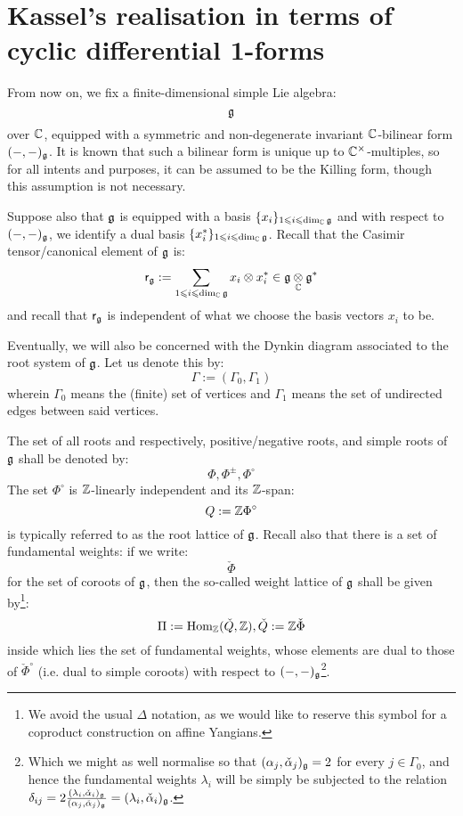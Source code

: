 \section{Kassel's realisation in terms of cyclic differential 1-forms}
    \begin{convention} \label{conv: a_fixed_finite_dimensional_simple_lie_algebra}
        From now on, we fix a finite-dimensional simple Lie algebra:
            $$\mathfrak{g}$$
        over $\mathbb{C}$, equipped with a symmetric and non-degenerate invariant $\mathbb{C}$-bilinear form $(-, -)_{\mathfrak{g}}$. It is known that such a bilinear form is unique up to $\bbC^{\x}$-multiples, so for all intents and purposes, it can be assumed to be the Killing form, though this assumption is not necessary. 

        Suppose also that $\mathfrak{g}$ is equipped with a basis $\{x_i\}_{1 \leqslant i \leqslant \dim_{\mathbb{C}} \mathfrak{g}}$ and with respect to $(-, -)_{\mathfrak{g}}$, we identify a dual basis $\{x_i^*\}_{1 \leqslant i \leqslant \dim_{\mathbb{C}} \mathfrak{g}}$. Recall that the Casimir tensor/canonical element of $\mathfrak{g}$ is:
            $$\sfr_{\g} := \sum_{1 \leq i \leq \dim_{\bbC} \g} x_i \tensor x_i^* \in \g \tensor_{\bbC} \g^*$$
        and recall that $\mathsf{r}_{\mathfrak{g}}$ is independent of what we choose the basis vectors $x_i$ to be.

        Eventually, we will also be concerned with the Dynkin diagram associated to the root system of $\mathfrak{g}$. Let us denote this by:
            $$\Gamma := (\Gamma_0, \Gamma_1)$$
        wherein $\Gamma_0$ means the (finite) set of vertices and $\Gamma_1$ means the set of undirected edges between said vertices. 

        The set of all roots and respectively, positive/negative roots, and simple roots of $\mathfrak{g}$ shall be denoted by:
            $$\Phi, \Phi^{\pm}, \Phi^{\circ}$$
        The set $\Phi^{\circ}$ is $\mathbb{Z}$-linearly independent and its $\mathbb{Z}$-span:
            $$Q := \mathbb{Z} \Phi^{\circ}$$
        is typically referred to as the root lattice of $\mathfrak{g}$. Recall also that there is a set of fundamental weights: if we write:
            $$\check{\Phi}$$
        for the set of coroots of $\mathfrak{g}$, then the so-called weight lattice of $\mathfrak{g}$ shall be given by\footnote{We avoid the usual $\Delta$ notation, as we would like to reserve this symbol for a coproduct construction on affine Yangians.}:
            $$\Pi := \mathrm{Hom}_{\mathbb{Z}}(\check{Q}, \mathbb{Z}), \check{Q} := \mathbb{Z}\check{\Phi}$$
        inside which lies the set of fundamental weights, whose elements are dual to those of $\check{\Phi}^{\circ}$ (i.e. dual to simple coroots) with respect to $(-, -)_{\mathfrak{g}}$\footnote{Which we might as well normalise so that $(\alpha_j, \check{\alpha}_j)_{\mathfrak{g}} = 2$ for every $j \in \Gamma_0$, and hence the fundamental weights $\lambda_i$ will be simply be subjected to the relation $\delta_{ij} = 2 \frac{(\lambda_i, \check{\alpha}_i)_{\mathfrak{g}}}{(\alpha_j, \check{\alpha}_j)_{\mathfrak{g}}} = (\lambda_i, \check{\alpha}_i)_{\mathfrak{g}}$.}.
    \end{convention}

